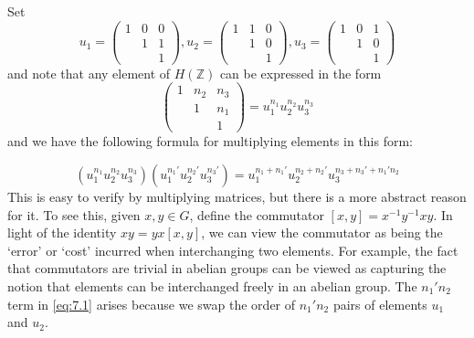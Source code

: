 \documentclass{article}
\numberwithin{equation}{section}
\begin{document}
Set
\begin{equation*}
  u_1 = \begin{pmatrix}
    1 & 0 & 0 \\ &1&1\\&&1
  \end{pmatrix},
  u_2 = \begin{pmatrix}
    1 & 1 & 0 \\ &1&0\\&&1
  \end{pmatrix},
  u_3 = \begin{pmatrix}
    1 & 0 & 1 \\ &1&0\\&&1
  \end{pmatrix}
\end{equation*}
and note that any element of $H(\mathbb{Z})$ can be expressed in the form
\begin{equation*}
  \begin{pmatrix}
    1 & n_2 & n_3 \\ &1&n_1 \\ &&1
  \end{pmatrix}= u_1^{n_1} u_2^{n_2} u_3^{n_3}
\end{equation*}
and we have the following formula for multiplying elements in this form:

\begin{equation}
  (u_1^{n_1} u_2^{n_2} u_3^{n_3})(u_1^{n_1'} u_2^{n_2'} u_3^{n_3'}) = u_1^{n_1+n_1'} u_2^{n_2+n_2'} u_3^{n_3+n_3'+n_1'n_2} \label{eq:7.1}
\end{equation}
This is easy to verify by multiplying matrices, but there is a more abstract reason for it. To see this, given $x,y \in G$, define the commutator $[x,y] = x^{-1} y^{-1} x y$.
In light of the identity $xy = yx [x,y]$, we can view the commutator as being the `error' or `cost' incurred when interchanging two elements.
For example, the fact that commutators are trivial in abelian groups can be viewed as capturing the notion that elements can be interchanged freely in an abelian group.
The $n_1' n_2$ term in \eqref{eq:7.1} arises because we swap the order of $n_1' n_2$ pairs of elements $u_1$ and $u_2$.
\end{document}
